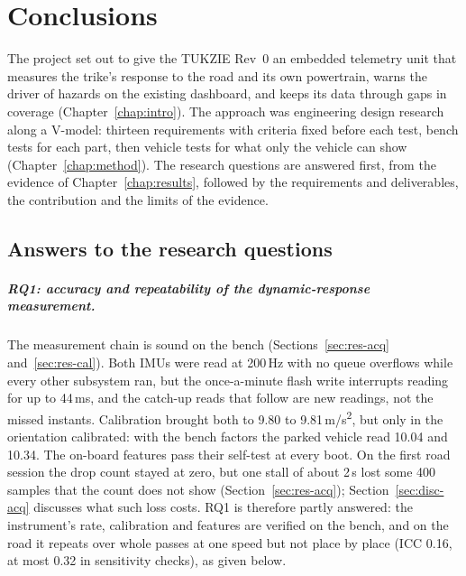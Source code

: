 \chapter{Conclusions}
\label{chap:conclusions}

The project set out to give the TUKZIE Rev~0 an embedded telemetry unit that measures the trike's response to the road and its own powertrain, warns the driver of hazards on the existing dashboard, and keeps its data through gaps in coverage (Chapter~\ref{chap:intro}). The approach was engineering design research along a V-model: thirteen requirements with criteria fixed before each test, bench tests for each part, then vehicle tests for what only the vehicle can show (Chapter~\ref{chap:method}). The research questions are answered first, from the evidence of Chapter~\ref{chap:results}, followed by the requirements and deliverables, the contribution and the limits of the evidence.

\section{Answers to the research questions}
\label{sec:conc-rqs}

\paragraph{RQ1: accuracy and repeatability of the dynamic-response measurement.} The measurement chain is sound on the bench (Sections~\ref{sec:res-acq} and~\ref{sec:res-cal}). Both IMUs were read at 200\,Hz with no queue overflows while every other subsystem ran, but the once-a-minute flash write interrupts reading for up to 44\,ms, and the catch-up reads that follow are new readings, not the missed instants. Calibration brought both to 9.80 to 9.81\,m/s\textsuperscript{2}, but only in the orientation calibrated: with the bench factors the parked vehicle read 10.04 and 10.34. The on-board features pass their self-test at every boot. On the first road session the drop count stayed at zero, but one stall of about 2\,s lost some 400 samples that the count does not show (Section~\ref{sec:res-acq}); Section~\ref{sec:disc-acq} discusses what such loss costs. RQ1 is therefore partly answered: the instrument's rate, calibration and features are verified on the bench, and on the road it repeats over whole passes at one speed but not place by place (ICC 0.16, at most 0.32 in sensitivity checks), as given below.

